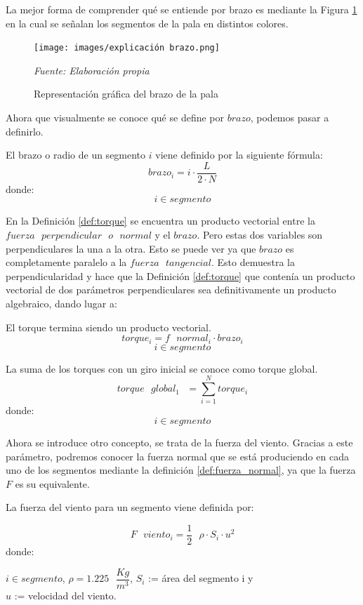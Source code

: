  La mejor forma de comprender qué se entiende por brazo es mediante la Figura \ref{fig:exp_brazo} en la cual se señalan los segmentos de la pala en distintos colores.
 
     \textbf{}
    \begin{figure}[H]
    \centering
    \texttt{[image: images/explicación brazo.png]}
    \caption{Representación gráfica del brazo de la pala}
    \label{fig:exp_brazo}
    \textit{Fuente: Elaboración propia}
\end{figure}

Ahora que visualmente se conoce qué se define por $brazo$, podemos pasar a definirlo.

\begin{definicion}
El  brazo o radio de un segmento $i$ viene definido por la siguiente fórmula:
$$ brazo_i  =  i \cdot \dfrac{L}{2 \cdot N}$$
    donde:
 $$ i \in segmento$$

\end{definicion}

 
 En la Definición \ref{def:torque} se encuentra un producto vectorial entre la $fuerza  \text{ }perpendicular \text{ } o \text{ } normal$ y el $brazo$. Pero estas dos variables son perpendiculares la una a la otra. Esto se puede ver ya que $brazo$ es completamente paralelo a la $fuerza \text{ } tangencial$. Esto demuestra la perpendicularidad y hace que la Definición \ref{def:torque} que contenía un producto vectorial de dos parámetros perpendiculares sea definitivamente un producto algebraico, dando lugar a:
 
  \begin{definicion}
  El torque termina siendo un producto vectorial.
 $$ torque_i = f \text{ } normal_i \cdot brazo_i$$
 $$ i \in segmento$$
 \label{def:torque_vectorial}
 \end{definicion}
 
\begin{definicion}
 La suma de los torques con un giro inicial se conoce como torque global.
 $$ torque \text{ } global_1 \text{ } = \sum_{i=1}^{N} torque_i $$
 donde:
 $$ i \in segmento$$
 \label{def:torque_global}
\end{definicion}


 Ahora se introduce otro concepto, se trata de la fuerza del viento. Gracias a este parámetro, podremos conocer la fuerza normal que se está produciendo en cada uno de los segmentos mediante la definición \ref{def:fuerza_normal}, ya que la fuerza $F$ es su equivalente.
 
 \begin{definicion}
 La fuerza del viento para un segmento viene definida por:
 
 $$ F \text{ } viento_i = \dfrac{1}{2} \text{ } \rho \cdot S_i \cdot u^2$$
 donde:
 
  \centering $i \in segmento$,  $\rho = 1.225 \text{ } \dfrac{Kg}{m^3}$, $S_i$ := área del segmento i y \\ $u$ := velocidad del viento.
 \label{def:fuerza_viento}
 \end{definicion}
 

